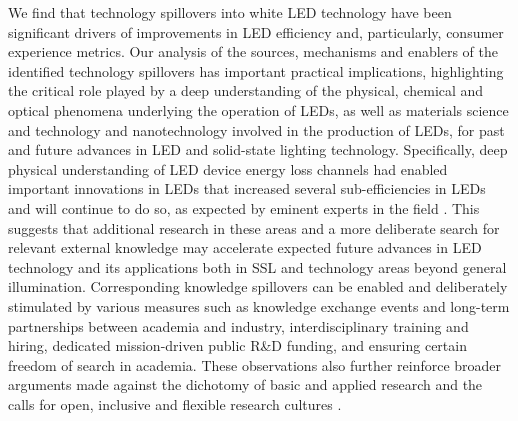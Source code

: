 \documentclass[parskip=full]{article}
\begin{document}
We find that technology spillovers into white LED technology have been significant drivers of improvements in LED efficiency and, particularly, consumer experience metrics. Our analysis of the sources, mechanisms and enablers of the identified technology spillovers has important practical implications, highlighting the critical role played by a deep understanding of the physical, chemical and optical phenomena underlying the operation of LEDs, as well as materials science and technology and nanotechnology involved in the production of LEDs, for past and future advances in LED and solid-state lighting technology. Specifically, deep physical understanding of LED device energy loss channels had enabled important innovations in LEDs that increased several sub-efficiencies in LEDs and will continue to do so, as expected by eminent experts in the field . This suggests that additional research in these areas and a more deliberate search for relevant external knowledge may accelerate expected future advances in LED technology and its applications both in SSL and technology areas beyond general illumination. Corresponding knowledge spillovers can be enabled and deliberately stimulated by various measures such as knowledge exchange events and long-term partnerships between academia and industry, interdisciplinary training and hiring, dedicated mission-driven public R\&D funding, and ensuring certain freedom of search in academia. These observations also further reinforce broader arguments made against the dichotomy of basic and applied research \cite{narayanamurti2016cycles, narayanamurti2021genesis} and the calls for open, inclusive and flexible research cultures \cite{Stephan2021}.
\end{document}
